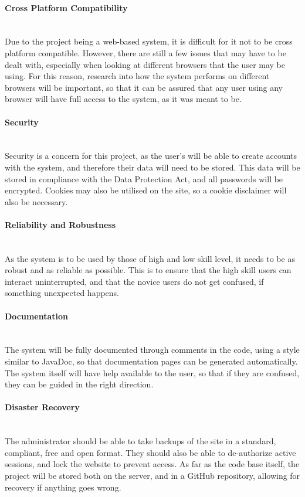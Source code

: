 \documentclass[a4paper,twoside,notitlepage,11pt]{article}
\begin{document}
\paragraph{Cross Platform Compatibility}\ \\
Due to the project being a web-based system, it is difficult for it not to be cross platform compatible. However, there are still a few issues that may have to be dealt with, especially when looking at different browsers that the user may be using. For this reason, research into how the system performs on different browsers will be important, so that it can be assured that any user using any browser will have full access to the system, as it was meant to be.

\paragraph{Security}\ \\
Security is a concern for this project, as the user's will be able to create accounts with the system, and therefore their data will need to be stored. This data will be stored in compliance with the Data Protection Act, and all passwords will be encrypted. Cookies may also be utilised on the site, so a cookie disclaimer will also be necessary. 

\paragraph{Reliability and Robustness}\ \\
As the system is to be used by those of high and low skill level, it needs to be as robust and as reliable as possible. This is to ensure that the high skill users can interact uninterrupted, and that the novice users do not get confused, if something unexpected happens.

\paragraph{Documentation}\ \\
The system will be fully documented through comments in the code, using a style similar to JavaDoc, so that documentation pages can be generated automatically. The system itself will have help available to the user, so that if they are confused, they can be guided in the right direction.

\paragraph{Disaster Recovery}\ \\
 The administrator should be able to take backups of the site in a standard, compliant, free and open format. They should also be able to de-authorize active sessions, and lock the website to prevent access. As far as the code base itself, the project will be stored both on the server, and in a GitHub repository, allowing for recovery if anything goes wrong.
 
\end{document}
